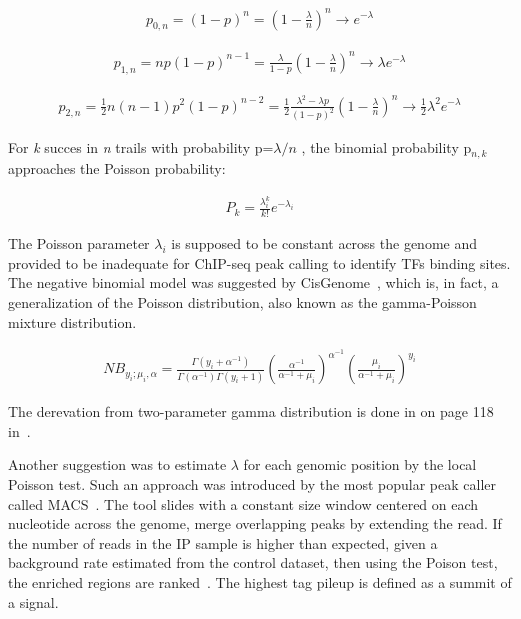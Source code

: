 \begin{align*}
    p_{0,n} = (1 - p)^{n} = \left(1-{\frac{\lambda}{n}}\right)^{n} \to e^{-\lambda}
\end{align*}

\begin{align*}
    p_{1,n} = np(1 - p)^{n-1} = \frac{\lambda}{1-p}\left(1-{\frac{\lambda}{n}}\right)^{n} \to \lambda e^{-\lambda}
\end{align*}

\begin{align*}
    p_{2,n} = \frac{1}{2} n(n - 1) p^{2} (1-p)^{n-2} = \frac{1}{2} \frac{\lambda^{2} - \lambda p}{ (1-p)^{2}} \left(1-{\frac{\lambda}{n}}\right)^{n} \to \frac{1}{2} \lambda^{2} e^{-\lambda}
\end{align*}

For \textit{k} succes in \textit{n} trails with probability p=${\lambda / n}$ , the binomial probability p$_{n,k}$ approaches the Poisson probability:

\begin{align*}
    P_k = \frac{\lambda _i ^{k}}{k!} e^{- \lambda _i}
\end{align*}

The Poisson parameter $\lambda_i$ is supposed to be constant across the genome and provided to be inadequate for ChIP-seq peak calling to identify TFs binding sites. 
The negative binomial model was suggested by CisGenome~\cite{ji2008inte}, which is, in fact, a generalization of the Poisson distribution, also known as the gamma-Poisson mixture distribution. 

\begin{align*}
    NB_{y_i; \mu _i, \alpha} = \frac{\Gamma (y_i + \alpha ^{-1})}{\Gamma(\alpha ^{-1})\Gamma(y_i + 1)} \left(\frac{\alpha ^{-1}}{\alpha ^{-1} + \mu_i}\right) ^{\alpha ^{-1}} \left(\frac{ \mu _i}{ \alpha ^{-1} + \mu _i}\right) ^{y _i}
\end{align*}

The derevation from two-parameter gamma distribution is done in on page 118 in~\cite[Cameron and Trivedi (2013)]{cameron2013regression}.

Another suggestion was to estimate $\lambda$ for each genomic position by the local Poisson test. 
Such an approach was introduced by the most popular peak caller called MACS~\cite{zhang2008model}.
The tool slides with a constant size window centered on each nucleotide across the genome, merge overlapping peaks by extending the read.
If the number of reads in the IP sample is higher than expected, given a background rate estimated from the control dataset, then using the Poison test, the enriched regions are ranked~\cite{thomas2017features}. 
The highest tag pileup is defined as a summit of a signal.  


